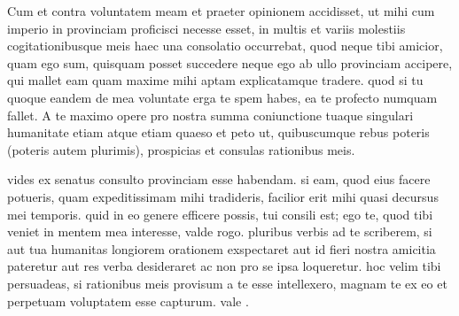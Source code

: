 


 Cum et contra voluntatem meam et praeter opinionem accidisset, ut mihi cum imperio in provinciam proficisci necesse esset, in multis et variis molestiis cogitationibusque meis haec una consolatio occurrebat, quod neque tibi amicior, quam ego sum, quisquam posset succedere neque ego ab ullo provinciam accipere, qui mallet eam quam maxime mihi aptam explicatamque tradere. quod si tu quoque eandem de mea voluntate erga te spem habes, ea te profecto numquam fallet. A te maximo opere pro nostra summa coniunctione tuaque singulari humanitate etiam atque etiam quaeso et peto ut, quibuscumque rebus poteris (poteris autem plurimis), prospicias et consulas rationibus meis.

 vides ex senatus consulto provinciam esse habendam. si eam, quod eius facere potueris, quam expeditissimam mihi tradideris, facilior erit mihi quasi decursus mei temporis. quid in eo genere efficere possis, tui consili est; ego te, quod tibi veniet in mentem mea interesse, valde rogo. pluribus verbis ad te scriberem, si aut tua humanitas longiorem orationem exspectaret aut id fieri nostra amicitia pateretur aut res verba desideraret ac non pro se ipsa loqueretur. hoc velim tibi persuadeas, si rationibus meis provisum a te esse intellexero, magnam te ex eo et perpetuam voluptatem esse capturum. vale .
